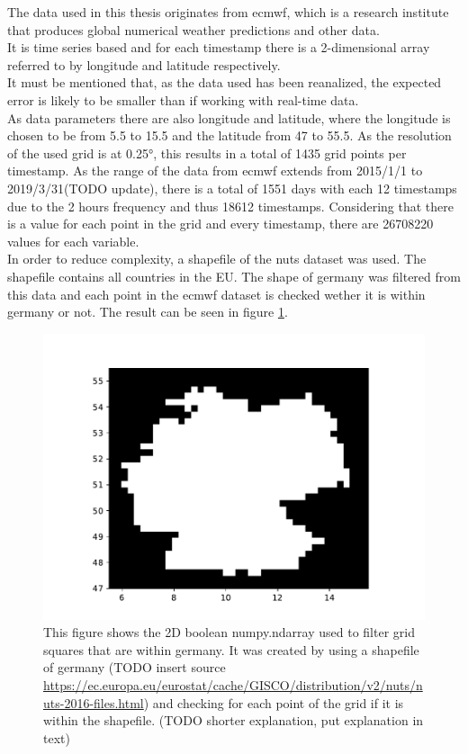 The data used in this thesis originates from \acrshort{ecmwf}, which is a research institute that produces global numerical weather predictions and other data.\\
It is time series based and for each timestamp there is a 2-dimensional array referred to by longitude and latitude respectively.\\

It must be mentioned that, as the data used has been reanalized, the expected error is likely to be smaller than if working with real-time data.\\

As data parameters there are also longitude and latitude, where the longitude is chosen to be from 5.5 to 15.5 and the latitude from 47 to 55.5. As the resolution of the used grid is at 0.25°, this results in a total of 1435 grid points per timestamp. As the range of the data from \acrshort{ecmwf} extends from 2015/1/1 to 2019/3/31(TODO update), there is a total of 1551 days with each 12 timestamps due to the 2 hours frequency and thus 18612 timestamps. Considering that there is a value for each point in the grid and every timestamp, there are 26708220 values for each variable.\\

In order to reduce complexity, a shapefile of the \acrshort{nuts} dataset was used. The shapefile contains all countries in the EU. The shape of germany was filtered from this data and each point in the \acrshort{ecmwf} dataset is checked wether it is within germany or not. The result can be seen in figure \ref{fig:isin}.\\

\begin{figure}[h!]%
\centering
\includegraphics[width=.7\columnwidth]{plots/isin}%
\caption{This figure shows the 2D boolean numpy.ndarray used to filter grid squares that are within germany. It was created by using a shapefile of germany (TODO insert source \url{https://ec.europa.eu/eurostat/cache/GISCO/distribution/v2/nuts/nuts-2016-files.html}) and checking for each point of the grid if it is within the shapefile. (TODO shorter explanation, put explanation in text)}%
\label{fig:isin}%
\end{figure}

